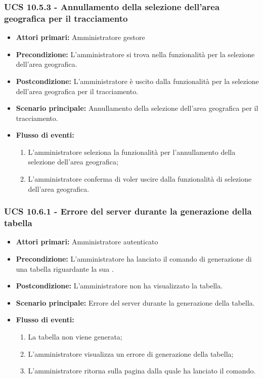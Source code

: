 \subsubsection{UCS 10.5.3 - Annullamento della selezione dell'area geografica per il tracciamento}%
\begin{itemize}
\item \textbf{Attori primari:} Amministratore gestore
\item \textbf{Precondizione:} L'amministratore si trova nella funzionalità per la selezione dell'area geografica.
\item \textbf{Postcondizione:} L'amministratore è uscito dalla funzionalità per la selezione dell'area geografica per il tracciamento.
\item \textbf{Scenario principale:} Annullamento della selezione dell'area geografica per il tracciamento.
\item \textbf{Flusso di eventi:}
    \begin{enumerate}
    \item L'amministratore seleziona la funzionalità per l'annullamento della selezione dell'area geografica;
    \item L'amministratore conferma di voler uscire dalla funzionalità di selezione dell'area geografica.
    \end{enumerate} 
\end{itemize}

\subsubsection{UCS 10.6.1 - Errore del server durante la generazione della tabella}
\begin{itemize}
    \item \textbf{Attori primari:} Amministratore autenticato
    \item \textbf{Precondizione:} L'amministratore ha lanciato il comando di generazione di una tabella riguardante la sua .
    \item \textbf{Postcondizione:} L'amministratore non ha visualizzato la tabella.
    \item \textbf{Scenario principale:} Errore del server durante la generazione della tabella.
    \item \textbf{Flusso di eventi:} \begin{enumerate}
    \item La tabella non viene generata;
    \item L'amministratore visualizza un errore di generazione della tabella;
    \item L'amministratore ritorna sulla pagina dalla quale ha lanciato il comando.
    \end{enumerate}
\end{itemize}

